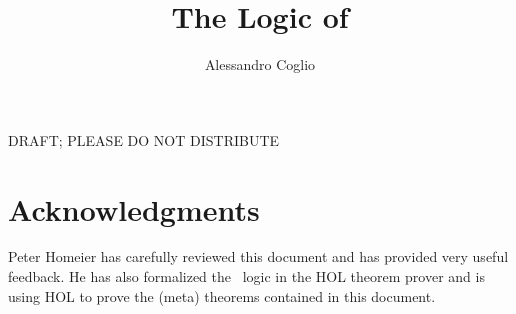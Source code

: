 \documentclass{article}
\begin{document}
\title{The Logic of \MS}
\author{Alessandro Coglio}
\maketitle

\begin{center}
{\Large DRAFT; PLEASE DO NOT DISTRIBUTE}
\end{center}








\appendix



\section*{Acknowledgments}

Peter Homeier has carefully reviewed this document and has provided very
useful feedback. He has also formalized the \MS\ logic in the HOL theorem
prover and is using HOL to prove the (meta) theorems contained in this
document.

%


\end{document}
